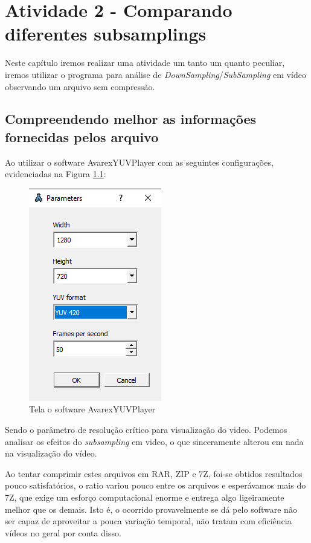 \captionsetup{justification=centering,margin=0cm}
\label{cap:atividade2}  %

\chapter[Atividade 2 - Comparando diferentes subsamplings]{Atividade 2 - Comparando diferentes subsamplings}
Neste capítulo iremos realizar uma atividade um tanto um quanto peculiar, iremos utilizar o programa para análise de \textit{DownSampling}/\textit{SubSampling} em vídeo observando um arquivo sem compressão.

\section{Compreendendo melhor as informações fornecidas pelos arquivo}
Ao utilizar o software AvarexYUVPlayer com as seguintes configurações, evidenciadas na Figura \ref{fig:imagem8}:

\begin{figure}
    \centering
    \caption{Tela o software AvarexYUVPlayer}
    \label{fig:imagem8}
    \includegraphics{Documeto/1-ElementosTextuais/images/08.png}

    \autoriaPropria
\end{figure}

\paragrafo Sendo o parâmetro de resolução crítico para visualização do video. Podemos analisar os efeitos do \textit{subsampling} em video, o que sinceramente alterou em nada na visualização do vídeo.

\paragrafo Ao tentar comprimir estes arquivos em RAR, ZIP e 7Z, foi-se obtidos resultados pouco satisfatórios, o ratio variou pouco entre os arquivos e esperávamos mais do 7Z, que exige um esforço computacional enorme e entrega algo ligeiramente melhor que os demais. Isto é, o ocorrido provavelmente se dá pelo software não ser capaz de aproveitar a pouca variação temporal, não tratam com eficiência vídeos no geral por conta disso.

